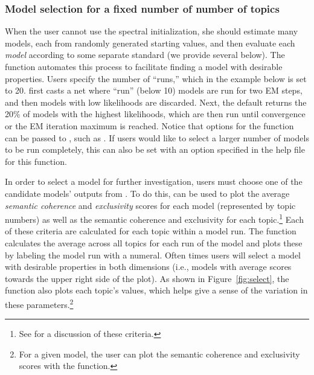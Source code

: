 \documentclass[article,shortnames]{jss}
\begin{document}
\subsubsection{Model selection for a fixed number of number of topics}

When the user cannot use the spectral initialization, she should estimate many models, each from randomly generated starting values, and then evaluate each \emph{model} according to some separate standard (we provide several below). The function  automates this process to facilitate finding a model with desirable properties. Users specify the number of ``runs,'' which in the example below is set to 20.  first casts a net where ``run'' (below 10) models are run for two EM steps, and then models with low likelihoods are discarded. Next, the default returns the 20\% of models with the highest likelihoods, which are then run until convergence or the EM iteration maximum is reached. Notice that options for the  function can be passed to , such as . If users would like to select a larger number of models to be run completely, this can also be set with an option specified in the help file for this function.

\begin{Schunk}
\end{Schunk}
In order to select a model for further investigation, users must choose one of the candidate models' outputs from . To do this,  can be used to plot the average \emph{semantic coherence} and \emph{exclusivity} scores for each model (represented by topic numbers) as well as the semantic coherence and exclusivity for each topic.\footnote{See \citet{stmjasa,ajps} for a discussion of these criteria.} Each of these criteria are calculated for each topic within a model run. The  function calculates the average across all topics for each run of the model and plots these by labeling the model run with a numeral. Often times users will select a model with desirable properties in both dimensions (i.e., models with average scores towards the upper right side of the plot). As shown in Figure~\ref{fig:select}, the  function also plots each topic's values, which helps give a sense of the variation in these parameters.\footnote{For a given model, the user can plot the semantic coherence and exclusivity scores with the  function.}
\end{document}
